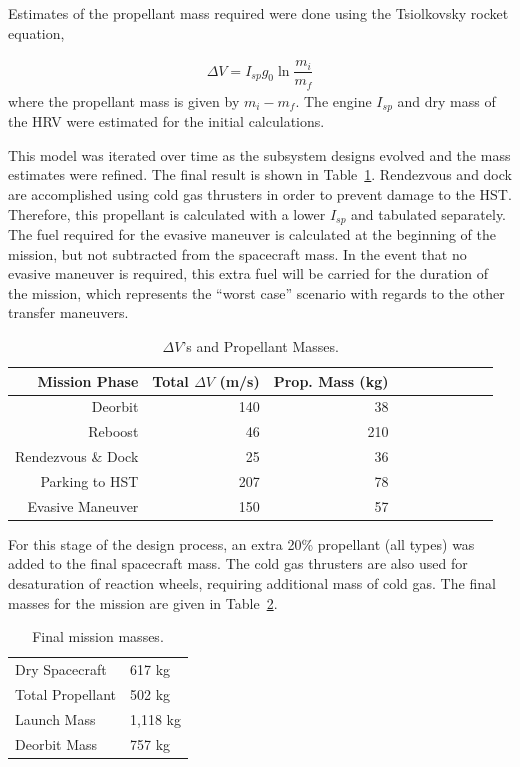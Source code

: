 \documentclass[paper=letter, fontsize=11pt]{scrartcl} %
\numberwithin{equation}{section} %
\numberwithin{figure}{section} %
\numberwithin{table}{section} %
\begin{document}
Estimates of the propellant mass required were done using the Tsiolkovsky rocket equation,

\begin{align*}
\Delta V = I_{sp} g_0 \ln \dfrac{m_i}{m_f}
\end{align*}
where the propellant mass is given by $m_i-m_f$. The engine $I_{sp}$ and dry mass of the HRV were estimated for the initial calculations.

This model was iterated over time as the subsystem designs evolved and the mass estimates were refined. The final result is shown in Table~\ref{table:delta_vs}. Rendezvous and dock are accomplished using cold gas thrusters in order to prevent damage to the HST. Therefore, this propellant is calculated with a lower $I_{sp}$ and tabulated separately. The fuel required for the evasive maneuver is calculated at the beginning of the mission, but not subtracted from the spacecraft mass. In the event that no evasive maneuver is required, this extra fuel will be carried for the duration of the mission, which represents the ``worst case'' scenario with regards to the other transfer maneuvers.

\begin{table}[H]
\begin{center}
\begin{tabular}{rrrrrrrrrr}
\toprule
Mission Phase & Total $\Delta V$ (m/s) & Prop. Mass (kg) \\
\midrule
Deorbit & 				    140 & 					38 \\
Reboost & 					46  & 					210 \\
Rendezvous \& Dock &       	25	& 					36 \\
Parking to HST & 			207 & 					78 \\
Evasive Maneuver & 			150 & 					57 \\
\bottomrule
\end{tabular}
\end{center}
\caption{$\Delta V$'s and Propellant Masses.}
\label{table:delta_vs}
\end{table}


For this stage of the design process, an extra 20\% propellant (all types) was added to the final spacecraft mass. The cold gas thrusters are also used for desaturation of reaction wheels, requiring additional mass of cold gas. The final masses for the mission are given in Table~\ref{table:final_masses}.

\begin{table}[H]
\begin{center}
\begin{tabular}{ll}
\toprule
Dry Spacecraft & 617 kg \\
Total Propellant & 502 kg \\
Launch Mass & 1,118 kg \\
Deorbit Mass & 757 kg \\
\bottomrule
\end{tabular}
\end{center}
\caption{Final mission masses.}
\label{table:final_masses}
\end{table}
\end{document}

